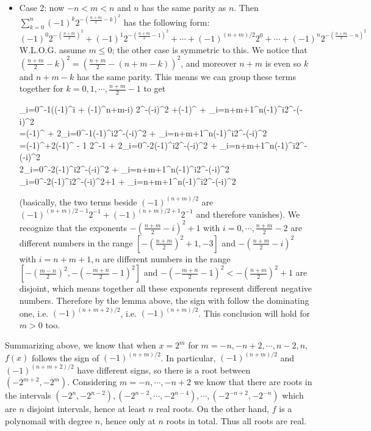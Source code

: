 \documentclass[11pt,a4paper]{article}
\newcommand{\<}{\langle}
\renewcommand{\>}{\rangle}
\newcommand{\dsum}{\displaystyle\sum}
\begin{document}
\begin{enumerate}
\begin{itemize}
		\item Case 2: now $-n<m<n$ and $n$ has the same parity as $n$. 
		Then $\displaystyle\sum_{k=0}^{n} (-1)^k 2^{- (\frac{n+m}{2}-k)^2}$ has the following form: 
		\[
		(-1)^0 2^{-(\frac{n+m}{2})^2} + (-1)^1 2^{-(\frac{n+m}{2} - 1)^2} +\cdots + (-1)^{(n+m)/2}2^0 + \cdots + (-1)^n 2^{-(\frac{n+m}{2} - n)^2} 
		\]
		W.L.O.G. assume $m\le 0$; the other case is symmetric to this. We notice that $(\frac{n+m}{2} - k)^2 = (\frac{n+m}{2} - (n+m -k))^2$, and moreover $n+m$ is even so $k$ and $n+m-k$ has the same parity. This means we can group these terms together for $k=0, 1, \cdots , \frac{n+m}{2}-1$ to get 
		\begin{flalign*}
		\dsum_{i=0}^{-1}((-1)^i  + (-1)^{n+m-i}) 2^{-(-i)^2}
		+(-1)^{}
		+ \dsum_{i=n+m+1}^{n}(-1)^{i}2^{-(-i)^2}
		\\=(-1)^{} + 2\dsum_{i=0}^{-1}(-1)^i2^{-(-i)^2}
		+ \dsum_{i=n+m+1}^{n}(-1)^{i}2^{-(-i)^2}
		\\=(-1)^{}+2(-1)^{ - 1} 2^{-1} + 2\dsum_{i=0}^{-2}(-1)^i2^{-(-i)^2}
		+ \dsum_{i=n+m+1}^{n}(-1)^{i}2^{-(-i)^2}
		\\2\dsum_{i=0}^{-2}(-1)^i2^{-(-i)^2}
		+ \dsum_{i=n+m+1}^{n}(-1)^{i}2^{-(-i)^2}
		\\\dsum_{i=0}^{-2}(-1)^i2^{-(-i)^2+1}
		+ \dsum_{i=n+m+1}^{n}(-1)^{i}2^{-(-i)^2}
		\end{flalign*}
		(basically, the two terms beside $(-1)^{(n+m)/2}$ are $(-1)^{(n+m)/2-1}2^{-1}+(-1)^{(n+m)/2+1}2^{-1}$ and therefore vanishes). 
		We recognize that the exponents $-(\frac{n+m}{2}-i)^2+1$ with $i=0, \cdots , \frac{n+m}{2}-2$ are different numbers in the range $[-(\frac{n+m}{2})^2+1, -3]$ and $-(\frac{n+m}{2}-i)^2$ with $i=n+m+1, n$ are different numbers in the range $[-(\frac{m-n}{2})^2, -(-\frac{m+n}{2}-1)^2]$ and $-(-\frac{m+n}{2}-1)^2 < -(\frac{n+m}{2})^2+1$ are disjoint, which means together all these exponents represent different negative numbers. Therefore by the lemma above, the sign with follow the dominating one, i.e. $(-1)^{(n+m+2)/2}$, i.e. $(-1)^{(n+m)/2}$. This conclusion will hold for $m>0$ too. 
	\end{itemize}
	Summarizing above, we know that when $x=2^{m}$ for $m=-n, -n+2, \cdots , n-2, n$, $f(x)$ follows the sign of $(-1)^{(n+m)/2}$. In particular, $(-1)^{(n+m)/2}$ and $(-1)^{(n+m+2)/2}$ have different signs, so there is a root between $(-2^{m+2}, -2^m)$. 
	Considering $m=-n, \cdots , -n+2$ we know that there are roots in the intervals 
	$(-2^{n}, -2^{n-2}), (-2^{n-2}, \cdots , -2^{n-4}), \cdots , (-2^{-n+2}, -2^{-n})$ which are $n$ disjoint intervals, hence at least $n$ real roots. On the other hand, $f$ is a polynomail with degree $n$, hence only at $n$ roots in total. Thus all roots are real. 
	
\end{enumerate}
\end{document}
